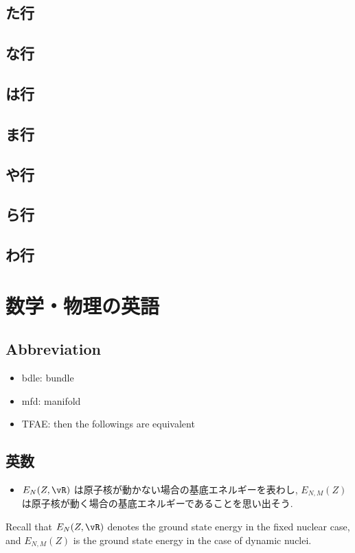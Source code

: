 \documentclass[openany, a4paper, oneside]{jsbook}
\begin{document}
\section{た行}

\section{な行}

\section{は行}

\section{ま行}

\section{や行}

\section{ら行}

\section{わ行}

\chapter{数学・物理の英語}

\section{Abbreviation}

\begin{itemize}
\item bdle: bundle
\item mfd: manifold
\item TFAE: then the followings are equivalent
\end{itemize}
\section{英数}

\begin{itemize}
\item $E_N(Z, \vR)$ は原子核が動かない場合の基底エネルギーを表わし, $E_{N, M}(Z)$ は原子核が動く場合の基底エネルギーであることを思い出そう. \cite{LiebSeiringer1}
\end{itemize}
Recall that $E_N(Z, \vR)$ denotes the ground state energy in the fixed nuclear case,
and $E_{N, M}(Z)$ is the ground state energy in the case of dynamic nuclei.
\end{document}
